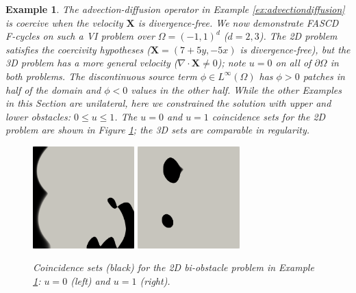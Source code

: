 \documentclass[letterpaper,final,12pt,reqno]{amsart}
\theoremstyle{cstyle}
\theoremstyle{cstyle*}
\theoremstyle{dstyle}
\newtheorem{example}[theorem]{Example}
\numberwithin{equation}{section}
\numberwithin{figure}{section}
\numberwithin{table}{section}
\numberwithin{theorem}{section}
\newcommand{\grad}{\nabla}
\newcommand{\bX}{\mathbf{X}}
\begin{document}
\begin{example}  \label{ex:results:advdiff}
The advection-diffusion operator in Example \ref{ex:advectiondiffusion} is coercive when the velocity $\bX$ is divergence-free.  We now demonstrate FASCD F-cycles on such a VI problem over $\Omega=(-1,1)^d$ ($d=2,3$).  The 2D problem satisfies the coercivity hypotheses ($\bX = (7+5y,-5x)$ is divergence-free), but the 3D problem has a more general velocity ($\grad\cdot\bX \ne 0$); note $u=0$ on all of $\partial \Omega$ in both problems.  The discontinuous source term $\phi \in L^\infty(\Omega)$ has $\phi>0$ patches in half of the domain and $\phi<0$ values in the other half.  While the other Examples in this Section are unilateral, here we constrained the solution with upper and lower obstacles: $0 \le u \le 1$.  The $u=0$ and $u=1$ coincidence sets for the 2D problem are shown in Figure \ref{fig:results:advdiff}; the 3D sets are comparable in regularity.

\begin{figure}[ht]
\begin{center}
\includegraphics[width=0.35\textwidth]{fixfigs/poll2d-zero-set.png} \qquad \includegraphics[width=0.35\textwidth]{fixfigs/poll2d-one-set.png}
\end{center}
\caption{Coincidence sets (black) for the 2D bi-obstacle problem in Example \ref{ex:results:advdiff}: $u=0$ (left) and $u=1$ (right).}
\label{fig:results:advdiff}
\end{figure}


\end{example}
\end{document}
